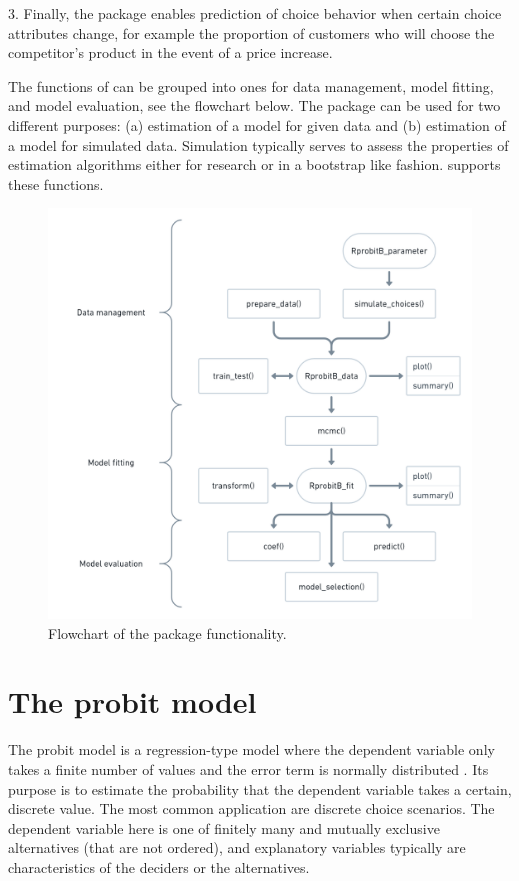 \documentclass[article]{jss}
\begin{document}
3. Finally, the package enables prediction of choice behavior when certain choice attributes change, for example the proportion of customers who will choose the competitor's product in the event of a price increase.

The functions of  can be grouped into ones for data management, model fitting, and model evaluation, see the flowchart below. The package can be used for two different purposes: (a) estimation of a model for given data and (b) estimation of a model for simulated data. Simulation typically serves to assess the properties of estimation algorithms either for research or in a bootstrap like fashion.  supports these functions.

\begin{figure}[t!]
  \includegraphics[scale = 0.4]{flowchart.png}
  \caption{Flowchart of the package functionality.}
  \label{fig:flowchart}
\end{figure}


\section{The probit model} \label{sec:probit_model}

The probit model is a regression-type model where the dependent variable only takes a finite number of values and the error term is normally distributed \citep{Agresti:2015}. Its purpose is to estimate the probability that the dependent variable takes a certain, discrete value. The most common application are discrete choice scenarios. The dependent variable here is one of finitely many and mutually exclusive alternatives (that are not ordered), and explanatory variables typically are characteristics of the deciders or the alternatives.
\end{document}
